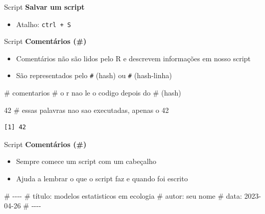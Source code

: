\documentclass[
  ignorenonframetext,
]{beamer}
\newenvironment{Shaded}{\begin{snugshade}}{\end{snugshade}}
\newcommand{\CommentTok}[1]{\textcolor[rgb]{0.37,0.37,0.37}{#1}}
\newcommand{\DecValTok}[1]{\textcolor[rgb]{0.68,0.00,0.00}{#1}}
\providecommand{\tightlist}{%
  \setlength{\itemsep}{0pt}\setlength{\parskip}{0pt}}\usepackage{longtable,booktabs,array}
\begin{document}
\begin{frame}[fragile]{}
\begin{block}{Script}
\protect\hypertarget{script-2}{}
\textbf{Salvar um script}

\begin{itemize}
\tightlist
\item
  Atalho: \texttt{ctrl\ +\ S}
\end{itemize}
\end{block}

\begin{block}{Script}
\protect\hypertarget{script-3}{}
\textbf{Comentários (\#)}

\begin{itemize}
\item
  Comentários não são lidos pelo R e descrevem informações em nosso
  script
\item
  São representados pelo \texttt{\#} (hash) ou
  \texttt{\#\textquotesingle{}} (hash-linha)
\end{itemize}

\begin{Shaded}
\begin{Highlighting}[]
\CommentTok{\# comentarios}
\CommentTok{\# o r nao le o codigo depois do \# (hash)}

\DecValTok{42} \CommentTok{\# essas palavras nao sao executadas, apenas o 42}
\end{Highlighting}
\end{Shaded}

\begin{verbatim}
[1] 42
\end{verbatim}
\end{block}

\begin{block}{Script}
\protect\hypertarget{script-4}{}
\textbf{Comentários (\#)}

\begin{itemize}
\item
  Sempre comece um script com um cabeçalho
\item
  Ajuda a lembrar o que o script faz e quando foi escrito
\end{itemize}

\begin{Shaded}
\begin{Highlighting}[]
\CommentTok{\#\textquotesingle{} {-}{-}{-}{-}}
\CommentTok{\#\textquotesingle{} título: modelos estatisticos em ecologia}
\CommentTok{\#\textquotesingle{} autor: seu nome}
\CommentTok{\#\textquotesingle{} data: 2023{-}04{-}26}
\CommentTok{\#\textquotesingle{} {-}{-}{-}{-}}
\end{Highlighting}
\end{Shaded}
\end{block}
\end{frame}
\end{document}
